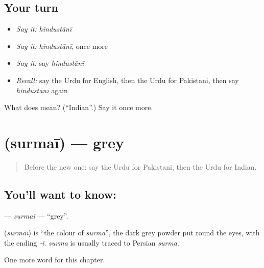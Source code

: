 \subsection*{Your turn}
\begin{itemize}
\raggedright
  \item \emph{Say it:} \emph{hindustānī}
  \item \emph{Say it:} \emph{hindustānī}, once more
  \item \emph{Say it:} say \emph{hindustānī}
  \item \emph{Recall:} say the Urdu for English, then the Urdu for Pakistani, then say \emph{hindustānī} again
\end{itemize}

\begin{tcolorbox}[breakable,colback=teal!4,colframe=teal!35!black,title={Before you move on}]
What does  mean? (\textquotedblleft{}Indian\textquotedblright{}.) Say it once more.
\end{tcolorbox}
\section[\texorpdfstring{\ur{سرمئی} (surmaī)}{سرمئی (surmaī)}]{ (surmaī) — grey}

\label{lesson:UR-C162-surmai}



\begin{quote}
Before the new one: say the Urdu for Pakistani, then the Urdu for Indian.
\end{quote}

\subsection*{You'll want to know: }
\textbf{} — \emph{surmaī} — \textquotedblleft{}grey\textquotedblright{}.

\begin{cousinweb}
\textbf{} (\emph{surmaī}) is \textquotedblleft{}the colour of \emph{surma}\textquotedblright{}, the dark grey powder put round the eyes, with the ending \emph{-ī}. \emph{surma} is usually traced to Persian \emph{surma}.
\end{cousinweb}

\begin{grammarlens}[title={What you've built}]
One more word for this chapter.
\end{grammarlens}

